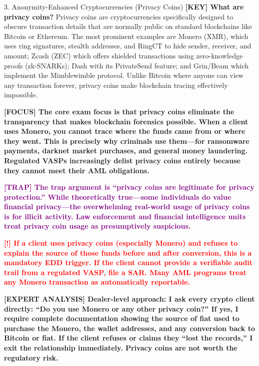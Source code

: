 \documentclass[11pt,a4paper]{beamer}
\newcommand{\redflag}[1]{\textcolor{red}{\textbf{[!] #1}}}
\newcommand{\examfocus}[1]{\textcolor{orange!80!black}{\textbf{[FOCUS] #1}}}
\newcommand{\trap}[1]{\textcolor{purple}{\textbf{[TRAP] #1}}}
\newcommand{\keyterm}[1]{\textcolor{red!80!black}{\textbf{[KEY] #1}}}
\newcommand{\expert}[1]{\textcolor{blue!70!black}{\textbf{[EXPERT ANALYSIS] #1}}}
\begin{document}
	\begin{frame}{3. Anonymity-Enhanced Cryptocurrencies (Privacy Coins)}
		\tiny
		\keyterm{What are privacy coins?} Privacy coins are cryptocurrencies specifically designed to obscure transaction details that are normally public on standard blockchains like Bitcoin or Ethereum. The most prominent examples are Monero (XMR), which uses ring signatures, stealth addresses, and RingCT to hide sender, receiver, and amount; Zcash (ZEC) which offers shielded transactions using zero-knowledge proofs (zk-SNARKs); Dash with its PrivateSend feature; and Grin/Beam which implement the Mimblewimble protocol. Unlike Bitcoin where anyone can view any transaction forever, privacy coins make blockchain tracing effectively impossible.
		
		\vspace{0.1cm}
		\examfocus{The core exam focus is that privacy coins eliminate the transparency that makes blockchain forensics possible. When a client uses Monero, you cannot trace where the funds came from or where they went. This is precisely why criminals use them—for ransomware payments, darknet market purchases, and general money laundering. Regulated VASPs increasingly delist privacy coins entirely because they cannot meet their AML obligations.}
		
		\vspace{0.1cm}
		\trap{The trap argument is “privacy coins are legitimate for privacy protection.” While theoretically true—some individuals do value financial privacy—the overwhelming real-world usage of privacy coins is for illicit activity. Law enforcement and financial intelligence units treat privacy coin usage as presumptively suspicious.}
		
		\vspace{0.1cm}
		\redflag{If a client uses privacy coins (especially Monero) and refuses to explain the source of those funds before and after conversion, this is a mandatory EDD trigger. If the client cannot provide a verifiable audit trail from a regulated VASP, file a SAR. Many AML programs treat any Monero transaction as automatically reportable.}
		
		\vspace{0.1cm}
		\expert{Dealer-level approach: I ask every crypto client directly: “Do you use Monero or any other privacy coin?” If yes, I require complete documentation showing the source of fiat used to purchase the Monero, the wallet addresses, and any conversion back to Bitcoin or fiat. If the client refuses or claims they “lost the records,” I exit the relationship immediately. Privacy coins are not worth the regulatory risk.}
	\end{frame}
	
\end{document}
